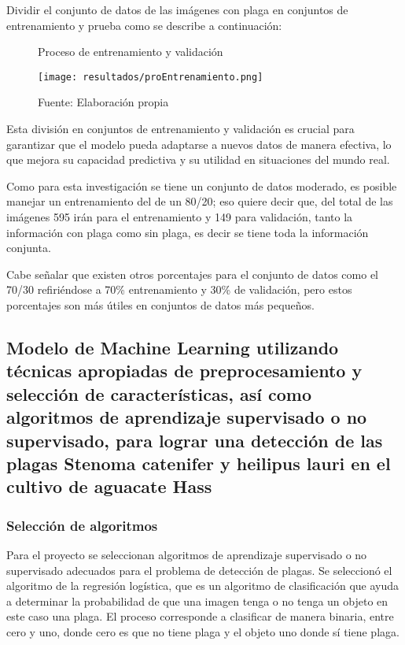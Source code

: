 Dividir el conjunto de datos de las imágenes con plaga en conjuntos de entrenamiento y prueba como se describe a continuación:

\begin{figure}[h]
\centering
\caption{Proceso de entrenamiento y validación}
\texttt{[image: resultados/proEntrenamiento.png]}
\caption*{\footnotesize Fuente: Elaboración propia}
\label{fig:figuraProEntrenamiento}
\end{figure}

Esta división en conjuntos de entrenamiento y validación es crucial para garantizar que el modelo pueda adaptarse a nuevos datos de manera efectiva, lo que mejora su capacidad predictiva y su utilidad en situaciones del mundo real.

Como para esta investigación se tiene un conjunto de datos moderado, es posible manejar un entrenamiento del de un 80/20; eso quiere decir que, del total de las imágenes 595 irán para el entrenamiento y 149 para validación, tanto la información con plaga como sin plaga, es decir se tiene toda la información conjunta.

Cabe señalar que existen otros porcentajes para el conjunto de datos como el 70/30 refiriéndose a 70\% entrenamiento y 30\% de validación, pero estos porcentajes son más útiles en conjuntos de datos más pequeños.

\subsection{Modelo de Machine Learning utilizando técnicas apropiadas de preprocesamiento y selección de características, así como algoritmos de aprendizaje supervisado o no supervisado, para lograr una detección de las plagas Stenoma catenifer y heilipus lauri en el cultivo de aguacate Hass}

\newpage

\subsubsection{Selección de algoritmos}

Para el proyecto se seleccionan algoritmos de aprendizaje supervisado o no supervisado adecuados para el problema de detección de plagas. Se seleccionó el algoritmo de la regresión logística, que es un algoritmo de clasificación que ayuda a determinar la probabilidad de que una imagen tenga o no tenga un objeto en este caso una plaga. El proceso corresponde a clasificar de manera binaria, entre cero y uno, donde cero es que no tiene plaga y el objeto uno donde sí tiene plaga.

